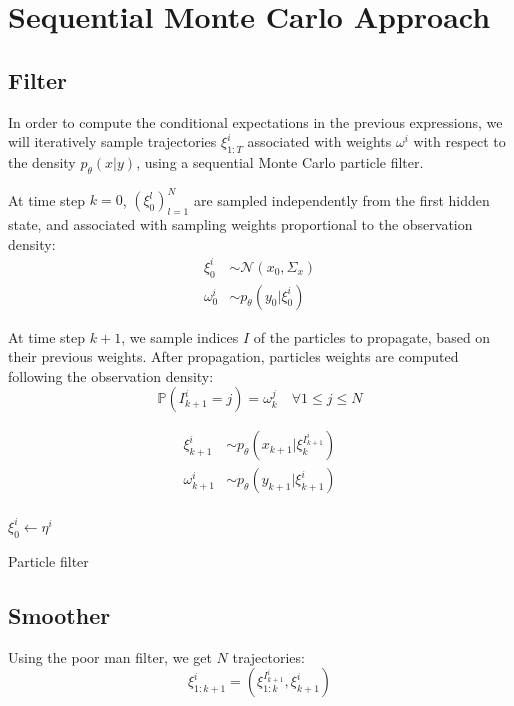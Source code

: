 \documentclass[10pt,a4paper]{report}
\begin{document}
\section{Sequential Monte Carlo Approach}
\label{sec:smc}

\subsection{Filter}
In order to compute the conditional expectations in the previous expressions, we will iteratively sample trajectories $\xi_{1:T}^i$ associated with weights $\omega^i$ with respect to the density $p_\theta(x | y)$, using a sequential Monte Carlo particle filter.

At time step $k=0$, $(\xi_0^l)_{l=1}^N$ are sampled independently from the first hidden state, and associated with sampling weights proportional to the observation density:
\begin{align*}
        \xi_0^i    & \sim \mathcal{N}(x_0, \Sigma_x) \\
        \omega_0^i & \sim p_\theta(y_0|\xi_0^i)
\end{align*}

At time step $k+1$, we sample indices $I$ of the particles to propagate, based on their previous weights.
After propagation, particles weights are computed following the observation density:
$$\mathbb{P}(I_{k+1}^i=j) = \omega_k^j \quad \forall 1 \leq j \leq N$$

\begin{align*}
    \xi_{k+1}^i &\sim p_\theta(x_{k+1}|\xi_k^{I_{k+1}^i}) \\
    \omega_{k+1}^i &\sim p_\theta(y_{k+1}|\xi_{k+1}^i) \\
\end{align*}

\begin{algorithm}
    $\xi_0^i \gets \eta^i$\;
    \caption{Particle filter}
\end{algorithm}

\subsection{Smoother}
Using the poor man filter, we get $N$ trajectories:
$$\xi_{1:k+1}^{i} = (\xi_{1:k}^{I_{k+1}^i}, \xi_{k+1}^i)$$
\end{document}
